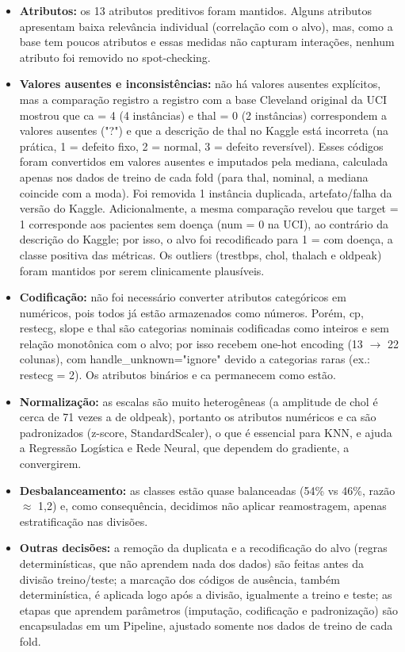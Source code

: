 \documentclass[11pt,letterpaper]{article}
\begin{document}
\begin{itemize}
\item \textbf{Atributos:} os 13 atributos preditivos foram mantidos. Alguns atributos apresentam baixa relevância individual (correlação com o alvo), mas, como a base tem poucos atributos e essas medidas não capturam interações, nenhum atributo foi removido no spot-checking.
\item \textbf{Valores ausentes e inconsistências:} não há valores ausentes explícitos, mas a comparação registro a registro com a base Cleveland original da UCI mostrou que ca = 4 (4 instâncias) e thal = 0 (2 instâncias) correspondem a valores ausentes ("?") e que a descrição de thal no Kaggle está incorreta (na prática, 1 = defeito fixo, 2 = normal, 3 = defeito reversível). Esses códigos foram convertidos em valores ausentes e imputados pela mediana, calculada apenas nos dados de treino de cada fold (para thal, nominal, a mediana coincide com a moda). Foi removida 1 instância duplicada, artefato/falha da versão do Kaggle. Adicionalmente, a mesma comparação revelou que target = 1 corresponde aos pacientes sem doença (num = 0 na UCI), ao contrário da descrição do Kaggle; por isso, o alvo foi recodificado para 1 = com doença, a classe positiva das métricas. Os outliers (trestbps, chol, thalach e oldpeak) foram mantidos por serem clinicamente plausíveis.
\item \textbf{Codificação:} não foi necessário converter atributos categóricos em numéricos, pois todos já estão armazenados como números. Porém, cp, restecg, slope e thal são categorias nominais codificadas como inteiros e sem relação monotônica com o alvo; por isso recebem one-hot encoding (13 \(\rightarrow\) 22 colunas), com handle\_unknown="ignore" devido a categorias raras (ex.: restecg = 2). Os atributos binários e ca permanecem como estão.
\item \textbf{Normalização:} as escalas são muito heterogêneas (a amplitude de chol é cerca de 71 vezes a de oldpeak), portanto os atributos numéricos e ca são padronizados (z-score, StandardScaler), o que é essencial para KNN, e ajuda a Regressão Logística e Rede Neural, que dependem do gradiente, a convergirem.
\item \textbf{Desbalanceamento:} as classes estão quase balanceadas (54\% vs 46\%, razão \(\approx\) 1,2) e, como consequência, decidimos não aplicar reamostragem, apenas estratificação nas divisões.
\item \textbf{Outras decisões:} a remoção da duplicata e a recodificação do alvo (regras determinísticas, que não aprendem nada dos dados) são feitas antes da divisão treino/teste; a marcação dos códigos de ausência, também determinística, é aplicada logo após a divisão, igualmente a treino e teste; as etapas que aprendem parâmetros (imputação, codificação e padronização) são encapsuladas em um Pipeline, ajustado somente nos dados de treino de cada fold.
\end{itemize}
\end{document}
